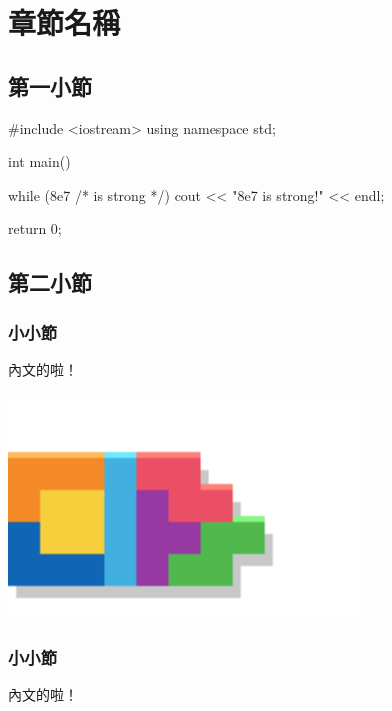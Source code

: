 \chapter{章節名稱}

\section{第一小節}







\pagebreak

\begin{C++}
#include <iostream>
using namespace std;

int main() {
	while (8e7 /* is strong */) {
		cout << "8e7 is strong!" << endl;
	}

	return 0;
}
\end{C++}

\section{第二小節}

\subsection{小小節}
內文的啦！

\includegraphics*[width = 0.7\textwidth]{images/Sample/Sample.png}

\subsection{小小節}
內文的啦！
